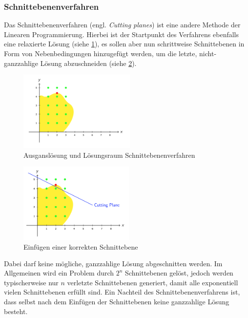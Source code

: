 \documentclass[a4paper, 11pt]{article}
\begin{document}
\subsubsection{Schnittebenenverfahren}
Das Schnittebenenverfahren (engl. \textit{Cutting planes}) ist eine andere
Methode der Linearen Programmierung. Hierbei ist der Startpunkt des Verfahrens
ebenfalls eine relaxierte Lösung (siehe \ref{img:cutting_planes_1}),
es sollen aber nun schrittweise Schnittebenen
in Form von Nebenbedingungen hinzugefügt werden, um die letzte, nicht-ganzzahlige Lösung
abzuschneiden (siehe \ref{img:cutting_planes_2}).

\begin{figure}
  \centering
  \includegraphics[width=\linewidth,height=150px,keepaspectratio]{schnittebenen_1.png}
  \caption{Ausganslösung und Lösungsraum Schnittebenenverfahren}
  \label{img:cutting_planes_1}
\end{figure}

\begin{figure}
  \centering
  \includegraphics[width=\linewidth,height=150px,keepaspectratio]{schnittebenen_2.png}
  \caption{Einfügen einer korrekten Schnittebene}
  \label{img:cutting_planes_2}
\end{figure}

Dabei darf keine mögliche, ganzzahlige Lösung abgeschnitten werden.
Im Allgemeinen wird ein Problem durch $2^n$ Schnittebenen gelöst, jedoch werden
typischerweise nur $n$ verletzte Schnittebenen generiert, damit alle exponentiell
vielen Schnittebenen erfüllt sind. Ein Nachteil des Schnittebenenverfahrens
ist, dass selbst nach dem Einfügen der Schnittebenen keine ganzzahlige Lösung
besteht.
\end{document}
